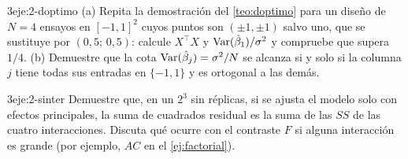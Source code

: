 \begin{ejercicio}{3}{eje:2-doptimo}
(a) Repita la demostración del \cref{teo:doptimo} para un diseño de $N=4$ ensayos en $[-1,1]^2$ cuyos puntos son $(\pm1,\pm1)$ salvo uno, que se sustituye por $(0{,}5;\,0{,}5)$: calcule $X^\top X$ y $\operatorname{Var}(\hat\beta_1)/\sigma^2$ y compruebe que supera $1/4$. (b) Demuestre que la cota $\operatorname{Var}(\hat\beta_j)=\sigma^2/N$ se alcanza si y solo si la columna $j$ tiene todas sus entradas en $\{-1,1\}$ y es ortogonal a las demás.
\end{ejercicio}

\begin{ejercicio}{3}{eje:2-sinter}
Demuestre que, en un $2^3$ sin réplicas, si se ajusta el modelo solo con efectos principales, la suma de cuadrados residual es la suma de las $SS$ de las cuatro interacciones. Discuta qué ocurre con el contraste $F$ si alguna interacción es grande (por ejemplo, $AC$ en el \cref{ej:factorial}).
\end{ejercicio}
